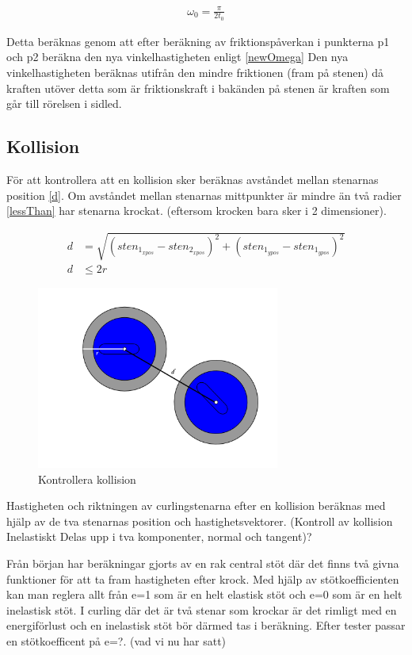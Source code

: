 \documentclass[11pt]{article} %
\begin{document}
\begin{align}%
 \omega_0 = \frac{\pi}{2 t_0} 
 \end{align}


 Detta beräknas genom att efter beräkning av friktionspåverkan i punkterna p1 och p2 beräkna den nya vinkelhastigheten enligt \eqref{newOmega}
Den nya vinkelhastigheten beräknas utifrån den mindre friktionen (fram på stenen) då kraften utöver detta som är friktionskraft i bakänden på stenen är kraften som går till rörelsen i sidled. 
 

\subsection{Kollision}

För att kontrollera att en kollision sker beräknas avståndet mellan stenarnas position \eqref{d}.
Om avståndet mellan stenarnas mittpunkter är mindre än två radier \eqref{lessThan} har stenarna krockat.  (eftersom krocken bara sker i 2 dimensioner). 

 \begin{align}\label{d}
 d& = \sqrt{(sten_{1_{xpos}} - sten_{2_{xpos}})^2   +   (sten_{1_{ypos}}-sten_{1_{ypos}})^2}\\\label{lessThan}
 d& \le 2 r
 \end{align}

\begin{figure}[ht!]
\centering
\includegraphics[width=80mm]{krock.png}
\caption{Kontrollera kollision}
\label{fig:kollision}
\label{overflow}
\end{figure}

Hastigheten och riktningen av curlingstenarna efter en kollision beräknas med hjälp av de tva stenarnas position och hastighetsvektorer.
(Kontroll av kollision Inelastiskt Delas upp i tva komponenter, normal och tangent)?

Från början har beräkningar gjorts av en rak central stöt där det finns två givna funktioner för att ta fram hastigheten efter krock. Med hjälp av stötkoefficienten kan man reglera allt från e=1 som är en helt elastisk stöt och e=0 som är en helt inelastisk stöt. I curling där det är två stenar som krockar är det rimligt med en energiförlust och en inelastisk stöt bör därmed tas i beräkning. Efter tester passar en stötkoefficent på e=?. (vad vi nu har satt)
\end{document}
